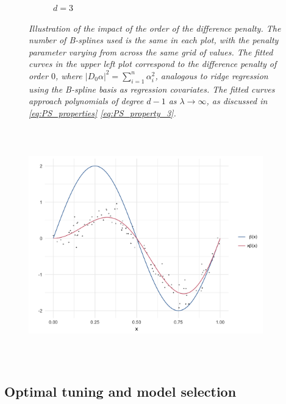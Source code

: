 \documentclass[12pt]{article}
\theoremstyle{definition}
\begin{document}
\begin{figure}[H]
\begin{subfigure}{.5\textwidth}
\caption{$d=3$}
\end{subfigure}
\caption{\textit{Illustration of the impact of the order of the difference penalty. The number of B-splines used is the same in each plot, with the penalty parameter varying from across the same grid of values. The fitted curves in the upper left plot correspond to the difference penalty of order $0$, where $\vert D_0 \alpha \vert^2 = \sum_{i=1}^n \alpha_i^2$, analogous to ridge regression using the B-spline basis as regression covariates. The fitted curves approach polynomials of degree $d-1$ as $\lambda \rightarrow \infty$, as discussed in \ref{eq:PS_properties} \ref{eq:PS_property_3}.}}
\label{fig:PS_penalty_section_figure_6}
\end{figure}




\begin{figure}[h]
\centering
 \graphicspath{{img/}}
  \includegraphics[width=4in, height=4in]{PS_penalty_section_figure_5.png}
\end{figure}




\subsection{Optimal tuning and model selection} \label{1D_model_selection_section}
\end{document}
